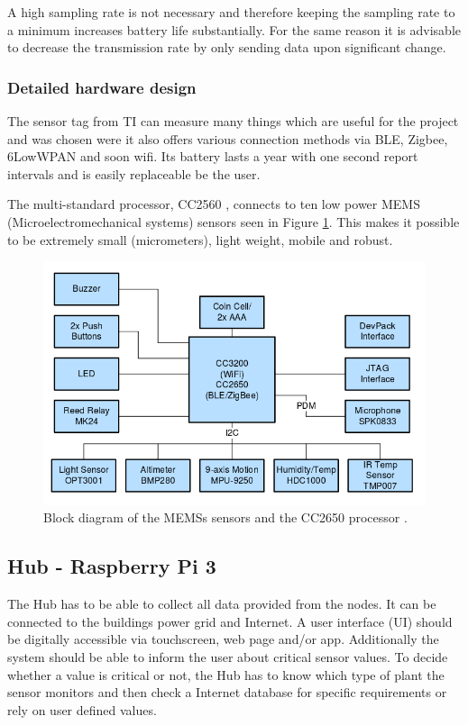 A high sampling rate is not necessary and therefore keeping the sampling rate to a minimum increases battery life substantially. For the same reason it is advisable to decrease the transmission rate by only sending data upon significant change.

\subsubsection{Detailed hardware design}

The sensor tag from TI can measure many things which are useful for the project and was chosen were it also offers various connection methods via BLE, Zigbee, 6LowWPAN and soon wifi. Its battery lasts a year with one second report intervals and is easily replaceable be the user. 

The multi-standard processor, CC2560 \cite{block-cc2650}, connects to ten low power MEMS (Microelectromechanical systems) \cite{MEMS} sensors seen in Figure \ref{fig:sensors}. This makes it possible to be extremely small (micrometers), light weight, mobile and robust.

\begin{figure}[!h]
	\includegraphics[width=\linewidth]{sensors-layout}
	\caption{Block diagram of the MEMSs sensors and the CC2650 processor \cite{block-cc2650}.}
	\label{fig:sensors}
\end{figure}


\subsection{Hub - Raspberry Pi 3}
The Hub has to be able to collect all data provided from the nodes. It can be connected to the buildings power grid and Internet. A user interface (UI) should be digitally accessible via touchscreen, web page and/or app. Additionally the system should be able to inform the user about critical sensor values. To decide whether a value is critical or not, the Hub has to know which type of plant the sensor monitors and then check a Internet database for specific requirements or rely on user defined values.

